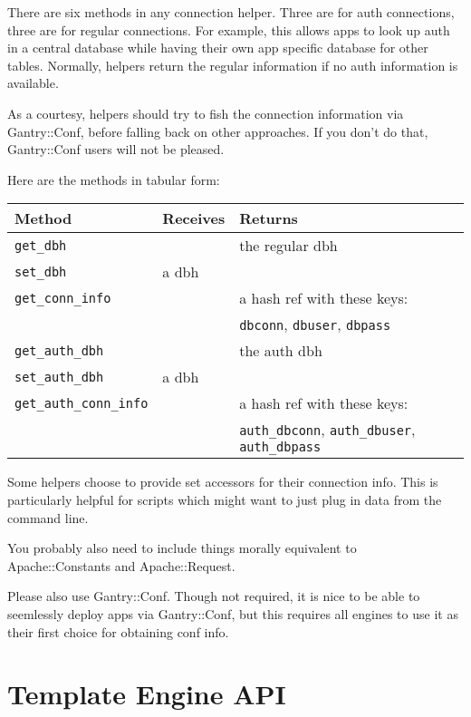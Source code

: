 There are six methods in any connection helper.  Three are for auth
connections, three are for regular connections.  For example, this allows
apps to look up auth in a central database while having their own app
specific database for other tables.  Normally, helpers return the regular
information if no auth information is available.

As a courtesy, helpers should try to fish the connection information via
Gantry::Conf, before falling back on other approaches.  If you don't do
that, Gantry::Conf users will not be pleased.

Here are the methods in tabular form:

\begin{tabular}{l|l|l}
Method & Receives & Returns \\
\hline
\verb+get_dbh+            &       & the regular dbh                \\
\verb+set_dbh+            & a dbh &                                \\
\verb+get_conn_info+      &       & a hash ref with these keys:    \\
                          &       & \verb+dbconn+, \verb+dbuser+,
                                    \verb+dbpass+                  \\
\hline
\verb+get_auth_dbh+       &       & the auth dbh                   \\
\verb+set_auth_dbh+       & a dbh &                                \\
\verb+get_auth_conn_info+ &       & a hash ref with these keys:    \\
                          &       & \verb+auth_dbconn+,
                                    \verb+auth_dbuser+,
                                    \verb+auth_dbpass+             \\
\end{tabular}

Some helpers choose to provide set accessors for their connection info.
This is particularly helpful for scripts which might want to just plug
in data from the command line.

You probably also need to include things morally equivalent to
Apache::Constants and Apache::Request.

Please also use Gantry::Conf.  Though not required, it is nice to be
able to seemlessly deploy apps via Gantry::Conf, but this requires all
engines to use it as their first choice for obtaining conf info.

\section{Template Engine API}

